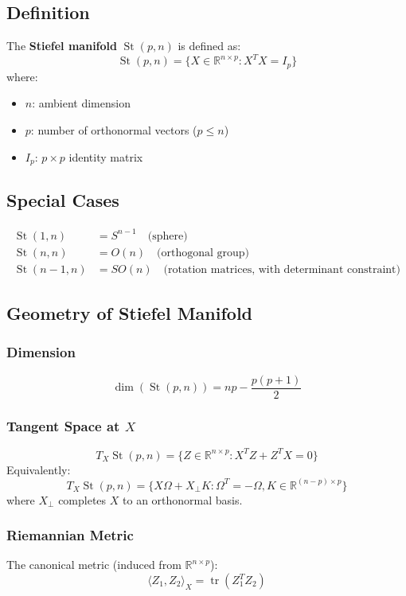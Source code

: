 \documentclass[11pt]{article}
\begin{document}
\subsection{Definition}
The \textbf{Stiefel manifold} $\operatorname{St}(p, n)$ is defined as:
\[
\operatorname{St}(p, n) = \{X \in \mathbb{R}^{n \times p} : X^T X = I_p\}
\]
where:
\begin{itemize}
    \item $n$: ambient dimension
    \item $p$: number of orthonormal vectors ($p \leq n$)
    \item $I_p$: $p \times p$ identity matrix
\end{itemize}

\subsection{Special Cases}
\begin{align*}
    \operatorname{St}(1, n) &= S^{n-1} \quad \text{(sphere)} \\
    \operatorname{St}(n, n) &= O(n) \quad \text{(orthogonal group)} \\
    \operatorname{St}(n-1, n) &= SO(n) \quad \text{(rotation matrices, with determinant constraint)}
\end{align*}

\subsection{Geometry of Stiefel Manifold}

\subsubsection{Dimension}
\[
\dim(\operatorname{St}(p, n)) = np - \frac{p(p+1)}{2}
\]

\subsubsection{Tangent Space at $X$}
\[
T_X\operatorname{St}(p, n) = \{Z \in \mathbb{R}^{n \times p} : X^T Z + Z^T X = 0\}
\]
Equivalently:
\[
T_X\operatorname{St}(p, n) = \{X\Omega + X_\perp K : \Omega^T = -\Omega, K \in \mathbb{R}^{(n-p)\times p}\}
\]
where $X_\perp$ completes $X$ to an orthonormal basis.

\subsubsection{Riemannian Metric}
The canonical metric (induced from $\mathbb{R}^{n \times p}$):
\[
\langle Z_1, Z_2 \rangle_X = \operatorname{tr}(Z_1^T Z_2)
\]
\end{document}
